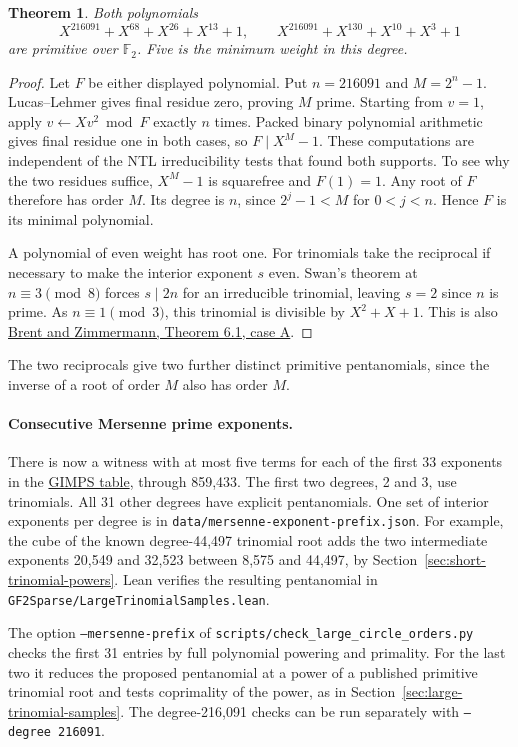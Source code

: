 \documentclass[11pt]{article}
\newtheorem{theorem}{Theorem}
\newcommand{\F}{\mathbb F_2}
\begin{document}
\begin{theorem}
Both polynomials
\[
 X^{216091}+X^{68}+X^{26}+X^{13}+1,\qquad
 X^{216091}+X^{130}+X^{10}+X^3+1
\]
are primitive over \(\F\). Five is the minimum weight in this degree.
\end{theorem}
\begin{proof}
Let \(F\) be either displayed polynomial. Put \(n=216091\) and
\(M=2^n-1\). Lucas--Lehmer gives final residue
zero, proving \(M\) prime. Starting from \(v=1\), apply
\(v\gets Xv^2\bmod F\) exactly \(n\) times. Packed binary polynomial
arithmetic gives final residue one in both cases, so \(F\mid X^M-1\).
These computations are
independent of the NTL irreducibility tests that found both supports. To see why the two residues suffice,
\(X^M-1\) is squarefree and \(F(1)=1\). Any root of \(F\) therefore
has order \(M\). Its degree is \(n\), since \(2^j-1<M\) for
\(0<j<n\). Hence \(F\) is its minimal polynomial.

A polynomial of even weight has root one. For trinomials take the
reciprocal if necessary to make the interior exponent \(s\) even.
Swan's theorem at \(n\equiv3\pmod8\) forces \(s\mid 2n\) for an
irreducible trinomial, leaving \(s=2\) since \(n\) is prime. As
\(n\equiv1\pmod3\), this trinomial is divisible by \(X^2+X+1\).
This is also \href{https://maths-people.anu.edu.au/~brent/pd/rpb212.pdf}
{Brent and Zimmermann, Theorem 6.1, case A}.
\end{proof}

The two reciprocals give two further distinct primitive pentanomials,
since the inverse of a root of order \(M\) also has order \(M\).

\paragraph{Consecutive Mersenne prime exponents.}
There is now a witness with at most five terms for each of the first
33 exponents in the \href{https://www.mersenne.org/primes/}{GIMPS table},
through 859,433. The first two degrees, 2 and 3, use trinomials.
All 31 other degrees have explicit pentanomials. One set of interior
exponents per degree is in \nolinkurl{data/mersenne-exponent-prefix.json}.
For example, the cube of the known degree-44,497 trinomial root adds
the two intermediate exponents 20,549 and 32,523 between 8,575 and
44,497, by Section~\ref{sec:short-trinomial-powers}. Lean verifies
the resulting pentanomial in \nolinkurl{GF2Sparse/LargeTrinomialSamples.lean}.

The option \texttt{--mersenne-prefix} of
\nolinkurl{scripts/check_large_circle_orders.py} checks the first
31 entries by full polynomial powering and primality. For the last
two it reduces the proposed pentanomial at a power of a published
primitive trinomial root and tests coprimality of the power, as in
Section~\ref{sec:large-trinomial-samples}. The degree-216,091 checks
can be run separately with \texttt{--degree 216091}.
\end{document}
